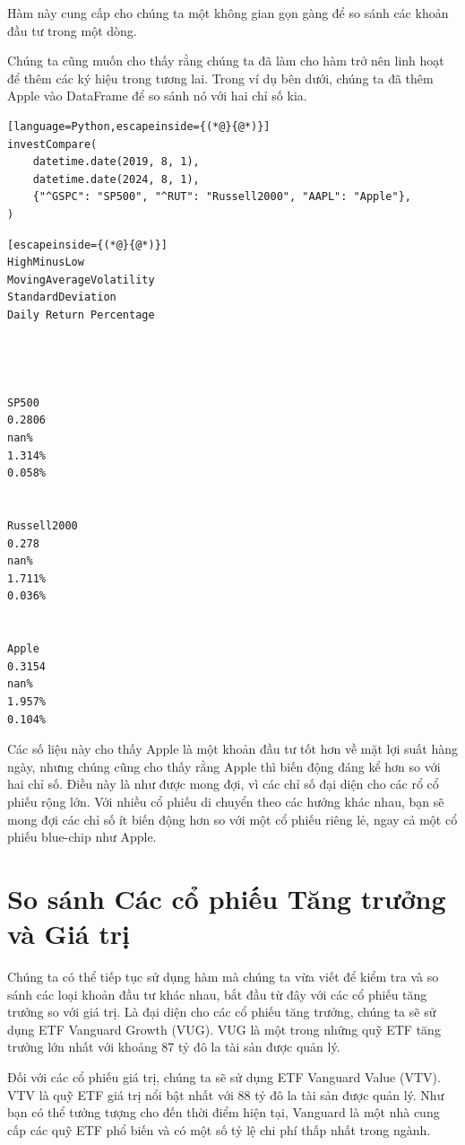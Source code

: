 Hàm này cung cấp cho chúng ta một không gian gọn gàng để so sánh các khoản đầu tư trong một dòng.

Chúng ta cũng muốn cho thấy rằng chúng ta đã làm cho hàm trở nên linh hoạt để thêm các ký hiệu trong tương lai. Trong ví dụ bên dưới, chúng ta đã thêm Apple vào DataFrame để so sánh nó với hai chỉ số kia.

\begin{lstlisting}[language=Python,escapeinside={(*@}{@*)}]
investCompare(
    datetime.date(2019, 8, 1),
    datetime.date(2024, 8, 1),
    {"^GSPC": "SP500", "^RUT": "Russell2000", "AAPL": "Apple"},
)
\end{lstlisting}

\begin{lstlisting}[escapeinside={(*@}{@*)}]
HighMinusLow
MovingAverageVolatility
StandardDeviation
Daily Return Percentage




SP500
0.2806
nan%
1.314%
0.058%


Russell2000
0.278
nan%
1.711%
0.036%


Apple
0.3154
nan%
1.957%
0.104%
\end{lstlisting}

Các số liệu này cho thấy Apple là một khoản đầu tư tốt hơn về mặt lợi suất hàng ngày, nhưng chúng cũng cho thấy rằng Apple thì biến động đáng kể hơn so với hai chỉ số. Điều này là như được mong đợi, vì các chỉ số đại diện cho các rổ cổ phiếu rộng lớn. Với nhiều cổ phiếu di chuyển theo các hướng khác nhau, bạn sẽ mong đợi các chỉ số ít biến động hơn so với một cổ phiếu riêng lẻ, ngay cả một cổ phiếu blue-chip như Apple.

\section{So sánh Các cổ phiếu Tăng trưởng và Giá trị}

Chúng ta có thể tiếp tục sử dụng hàm mà chúng ta vừa viết để kiểm tra và so sánh các loại khoản đầu tư khác nhau, bắt đầu từ đây với các cổ phiếu tăng trưởng so với giá trị. Là đại diện cho các cổ phiếu tăng trưởng, chúng ta sẽ sử dụng ETF Vanguard Growth (VUG). VUG là một trong những quỹ ETF tăng trưởng lớn nhất với khoảng 87 tỷ đô la tài sản được quản lý.

Đối với các cổ phiếu giá trị, chúng ta sẽ sử dụng ETF Vanguard Value (VTV). VTV là quỹ ETF giá trị nổi bật nhất với 88 tỷ đô la tài sản được quản lý. Như bạn có thể tưởng tượng cho đến thời điểm hiện tại, Vanguard là một nhà cung cấp các quỹ ETF phổ biến và có một số tỷ lệ chi phí thấp nhất trong ngành.

